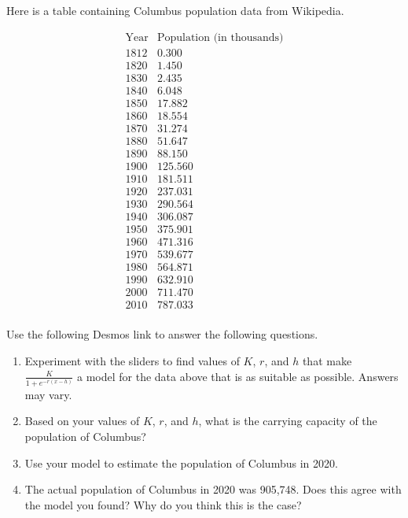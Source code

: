 \documentclass{ximera}
\begin{document}
\begin{exploration}
Here is a table containing Columbus population data from Wikipedia. 

$$
\begin{array}{c|c}
\text{Year}&\text{Population (in thousands)} \\
\hline
1812&0.300\\
1820&1.450\\
1830&2.435\\
1840&6.048\\
1850&17.882\\
1860&18.554\\
1870&31.274\\
1880&51.647\\
1890&88.150\\
1900&125.560\\
1910&181.511\\
1920&237.031\\
1930&290.564\\
1940&306.087\\
1950&375.901\\
1960&471.316\\
1970&539.677\\
1980&564.871\\
1990&632.910\\
2000&711.470\\
2010&787.033\\

\end{array}
$$

Use the following Desmos link to answer the following questions. 
\begin{center}
\end{center}
\begin{enumerate}[label=\alph*.]
\item Experiment with the sliders to find values of $K$, $r$, and $h$ that make $\frac{K}{1 + e^{-r(x - h)}}$ a model for the data above that is as suitable as possible. Answers may vary. 
\item Based on your values of $K$, $r$, and $h$, what is the carrying capacity of the population of Columbus?
\item Use your model to estimate the population of Columbus in 2020. 
\item The actual population of Columbus in 2020 was 905,748. Does this agree with the model you found? Why do you think this is the case?
\end{enumerate}

\end{exploration}
\end{document}
